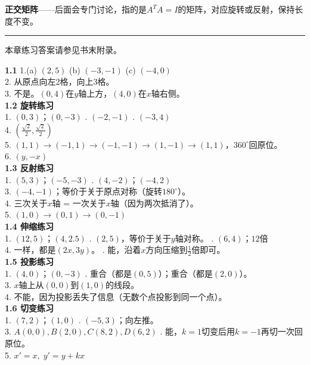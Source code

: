 \documentclass[a4paper,12pt]{ctexart}
\begin{document}
\textbf{正交矩阵}——后面会专门讨论，指的是$A^TA=I$的矩阵，对应旋转或反射，保持长度不变。

\vfill
\noindent\rule{\textwidth}{0.4pt}
本章练习答案请参见书末附录。

\newpage



\noindent\textbf{1.1} 1.(a) $(2,5)$ \quad (b) $(-3,-1)$ \quad (c) $(-4,0)$\\
2. 从原点向左2格，向上3格。\\
3. 不是。$(0,4)$在$y$轴上方，$(4,0)$在$x$轴右侧。\\

\noindent\textbf{1.2 旋转练习}\\
1. $(0,3)$；$(0,-3)$ . $(-2,-1)$ . $(-3,4)$\\
4. $(\frac{\sqrt2}{2},\frac{\sqrt2}{2})$\\
5. $(1,1)\to(-1,1)\to(-1,-1)\to(1,-1)\to(1,1)$，$360^\circ$回原位。\\
6. $(y,-x)$\\

\noindent\textbf{1.3 反射练习}\\
1. $(5,3)$；$(-5,-3)$ . $(4,-2)$；$(-4,2)$\\
3. $(-4,-1)$；等价于关于原点对称（旋转$180^\circ$）。\\
4. 三次关于$x$轴 = 一次关于$x$轴（因为两次抵消了）。\\
5. $(1,0)\to(0,1)\to(0,-1)$\\

\noindent\textbf{1.4 伸缩练习}\\
1. $(12,5)$；$(4,2.5)$ . $(2,5)$，等价于关于$y$轴对称。 . $(6,4)$；$12$倍\\
4. 一样，都是$(2x,3y)$。 . 能，沿着$x$方向压缩到$\frac12$倍即可。\\

\noindent\textbf{1.5 投影练习}\\
1. $(4,0)$；$(0,-3)$ . 重合（都是$(0,5)$）；重合（都是$(2,0)$）。\\
3. $x$轴上从$(0,0)$到$(1,0)$的线段。\\
4. 不能，因为投影丢失了信息（无数个点投影到同一个点）。\\

\noindent\textbf{1.6 切变练习}\\
1. $(7,2)$；$(1,0)$ . $(-5,3)$；向左推。\\
3. $A(0,0),B(2,0),C(8,2),D(6,2)$ . 能，$k=1$切变后用$k=-1$再切一次回原位。\\
5. $x'=x,\;y'=y+kx$\\
\end{document}

